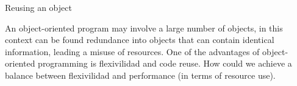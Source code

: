 \documentclass{elsart}
\begin{document}
Reusing an object

An object-oriented program may involve a large number of objects, in this context  can be found redundance into objects that can contain identical information, leading a misuse of resources. 
One of the advantages of object-oriented programming is flexivilidad and code reuse. 
How could we achieve a balance between flexivilidad and performance (in terms of resource use).




\label{}



\begin{thebibliography}{00}




\bibitem{}

\end{thebibliography}
\end{document}
